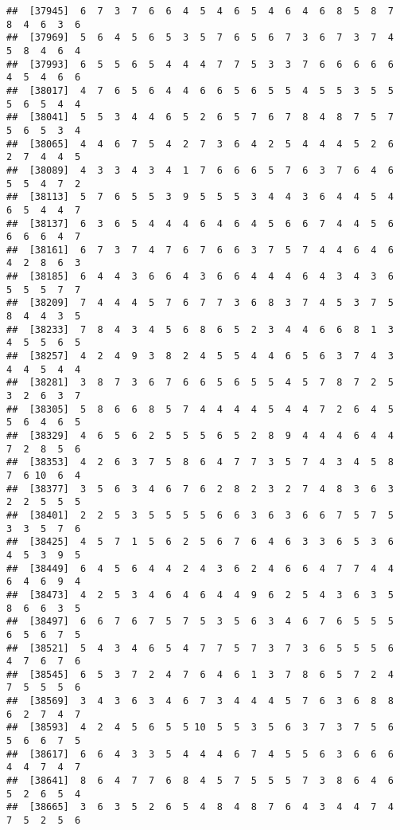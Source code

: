 \documentclass[
]{book}
\begin{document}
\begin{verbatim}
##  [37945]  6  7  3  7  6  6  4  5  4  6  5  4  6  4  6  8  5  8  7  8  4  6  3  6
##  [37969]  5  6  4  5  6  5  3  5  7  6  5  6  7  3  6  7  3  7  4  5  8  4  6  4
##  [37993]  6  5  5  6  5  4  4  4  7  7  5  3  3  7  6  6  6  6  6  4  5  4  6  6
##  [38017]  4  7  6  5  6  4  4  6  6  5  6  5  5  4  5  5  3  5  5  5  6  5  4  4
##  [38041]  5  5  3  4  4  6  5  2  6  5  7  6  7  8  4  8  7  5  7  5  6  5  3  4
##  [38065]  4  4  6  7  5  4  2  7  3  6  4  2  5  4  4  4  5  2  6  2  7  4  4  5
##  [38089]  4  3  3  4  3  4  1  7  6  6  6  5  7  6  3  7  6  4  6  5  5  4  7  2
##  [38113]  5  7  6  5  5  3  9  5  5  5  3  4  4  3  6  4  4  5  4  6  5  4  4  7
##  [38137]  6  3  6  5  4  4  4  6  4  6  4  5  6  6  7  4  4  5  6  6  6  6  4  7
##  [38161]  6  7  3  7  4  7  6  7  6  6  3  7  5  7  4  4  6  4  6  4  2  8  6  3
##  [38185]  6  4  4  3  6  6  4  3  6  6  4  4  4  6  4  3  4  3  6  5  5  5  7  7
##  [38209]  7  4  4  4  5  7  6  7  7  3  6  8  3  7  4  5  3  7  5  8  4  4  3  5
##  [38233]  7  8  4  3  4  5  6  8  6  5  2  3  4  4  6  6  8  1  3  4  5  5  6  5
##  [38257]  4  2  4  9  3  8  2  4  5  5  4  4  6  5  6  3  7  4  3  4  4  5  4  4
##  [38281]  3  8  7  3  6  7  6  6  5  6  5  5  4  5  7  8  7  2  5  3  2  6  3  7
##  [38305]  5  8  6  6  8  5  7  4  4  4  4  5  4  4  7  2  6  4  5  5  6  4  6  5
##  [38329]  4  6  5  6  2  5  5  5  6  5  2  8  9  4  4  4  6  4  4  7  2  8  5  6
##  [38353]  4  2  6  3  7  5  8  6  4  7  7  3  5  7  4  3  4  5  8  7  6 10  6  4
##  [38377]  3  5  6  3  4  6  7  6  2  8  2  3  2  7  4  8  3  6  3  2  2  5  5  5
##  [38401]  2  2  5  3  5  5  5  5  6  6  3  6  3  6  6  7  5  7  5  3  3  5  7  6
##  [38425]  4  5  7  1  5  6  2  5  6  7  6  4  6  3  3  6  5  3  6  4  5  3  9  5
##  [38449]  6  4  5  6  4  4  2  4  3  6  2  4  6  6  4  7  7  4  4  6  4  6  9  4
##  [38473]  4  2  5  3  4  6  4  6  4  4  9  6  2  5  4  3  6  3  5  8  6  6  3  5
##  [38497]  6  6  7  6  7  5  7  5  3  5  6  3  4  6  7  6  5  5  5  6  5  6  7  5
##  [38521]  5  4  3  4  6  5  4  7  7  5  7  3  7  3  6  5  5  5  6  4  7  6  7  6
##  [38545]  6  5  3  7  2  4  7  6  4  6  1  3  7  8  6  5  7  2  4  7  5  5  5  6
##  [38569]  3  4  3  6  3  4  6  7  3  4  4  4  5  7  6  3  6  8  8  6  2  7  4  7
##  [38593]  4  2  4  5  6  5  5 10  5  5  3  5  6  3  7  3  7  5  6  5  6  6  7  5
##  [38617]  6  6  4  3  3  5  4  4  4  6  7  4  5  5  6  3  6  6  6  4  4  7  4  7
##  [38641]  8  6  4  7  7  6  8  4  5  7  5  5  5  7  3  8  6  4  6  5  2  6  5  4
##  [38665]  3  6  3  5  2  6  5  4  8  4  8  7  6  4  3  4  4  7  4  7  5  2  5  6

\end{verbatim}
\end{document}
